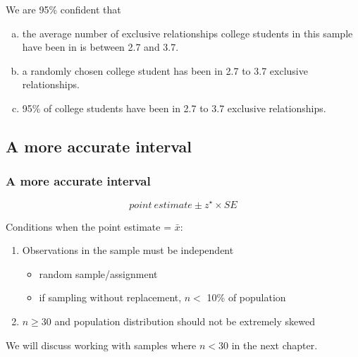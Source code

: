 
\begin{frame}
\frametitle{}


We are 95\% confident that
\begin{enumerate}[(a)]
\item the average number of exclusive relationships college students in this sample have been in is between 2.7 and 3.7.
\item a randomly chosen college student has been in 2.7 to 3.7 exclusive relationships.
\item 95\% of college students have been in 2.7 to 3.7 exclusive relationships.
\end{enumerate}

\end{frame}


\subsection{A more accurate interval}


\begin{frame}
\frametitle{A more accurate interval}

{\[ point~estimate\pm z^\star \times SE \] }

\pause

Conditions when the point estimate = $\bar{x}$:
\begin{enumerate}

\item {} Observations in the sample must be independent
\begin{itemize}
\item random sample/assignment
\item if sampling without replacement, $n <$ 10\% of population
\end{itemize}

\item {} $n \ge 30$ and population distribution should not be extremely skewed

\end{enumerate}

\pause

 We will discuss working with samples where $n < 30$ in the next chapter.

\end{frame}

